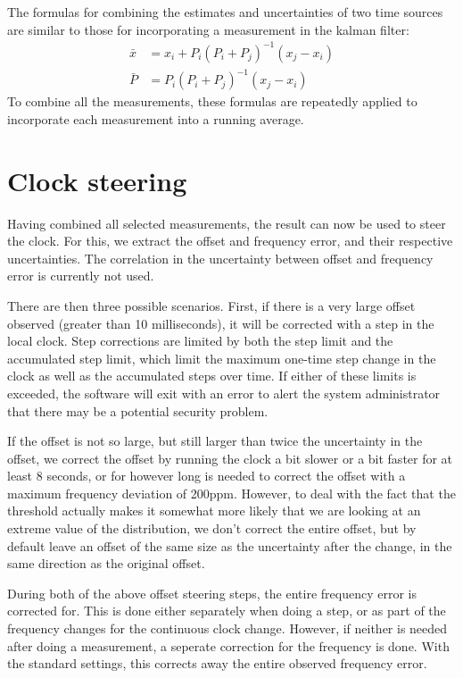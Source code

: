\documentclass{article}
\begin{document}
The formulas for combining the estimates and uncertainties of two time sources are similar to those for incorporating a measurement in the kalman filter:
\begin{align}
\bar{x} &= x_i + P_i(P_i+P_j)^{-1}(x_j - x_i)\\
\bar{P} &= P_i(P_i+P_j)^{-1}(x_j - x_i)
\end{align}
To combine all the measurements, these formulas are repeatedly applied to incorporate each measurement into a running average.

\section{Clock steering}\label{sec:steering}

Having combined all selected measurements, the result can now be used to steer the clock.
For this, we extract the offset and frequency error, and their respective uncertainties.
The correlation in the uncertainty between offset and frequency error is currently not used.

There are then three possible scenarios. First, if there is a very large offset observed (greater than 10 milliseconds), 
it will be corrected with a step in the local clock.
Step corrections are limited by both the step limit and the accumulated step limit, which limit the maximum one-time step change in the clock as well
as the accumulated steps over time. If either of these limits is exceeded, the software will exit with an error to alert the system administrator
that there may be a potential security problem.

If the offset is not so large, but still larger than twice the uncertainty in the offset, we correct the offset by running the clock a bit slower or a bit
faster for at least 8 seconds, or for however long is needed to correct the offset with a maximum frequency deviation of 200ppm. However, to deal with
the fact that the threshold actually makes it somewhat more likely that we are looking at an extreme value of the distribution, we don't correct the entire
offset, but by default leave an offset of the same size as the uncertainty after the change, in the same direction as the original offset.

During both of the above offset steering steps, the entire frequency error is corrected for. This is done either separately when doing a step, or as part
of the frequency changes for the continuous clock change. However, if neither is needed after doing a measurement, a seperate correction for the frequency
is done. With the standard settings, this corrects away the entire observed frequency error.
\end{document}
